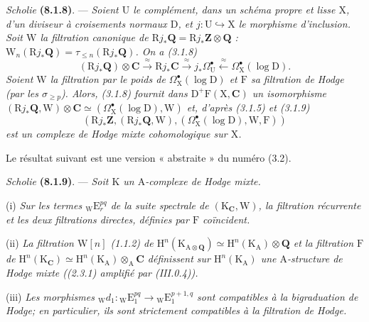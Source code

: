 \documentclass[11pt,leqno]{article}
\begin{document}
\textit{Scholie} \textbf{(8.1.8)}. — \textit{Soient \(\mathrm{U}\) le complément, dans un schéma propre et lisse \(\mathrm{X}\), d’un diviseur à croisements normaux \(\mathrm{D}\), et \(j:\mathrm{U}\hookrightarrow\mathrm{X}\) le morphisme d’inclusion. Soit \(\mathrm{W}\) la filtration canonique de \(\mathrm{R}j_{\ast}\mathbf{Q}=\mathrm{R}j_{\ast}\mathbf{Z}\otimes\mathbf{Q}\) : \(\mathrm{W}_{n}(\mathrm{R}j_{\ast}\mathbf{Q})=\tau_{\leq n}(\mathrm{R}j_{\ast}\mathbf{Q})\). On a (3.1.8)}
\[
(\mathrm{R}j_{\ast}\mathbf{Q})\otimes\mathbf{C}
\xrightarrow{\approx}\mathrm{R}j_{\ast}\mathbf{C}
\xrightarrow{\approx}j_{\ast}\Omega_{\mathrm{U}}^\bullet
\xleftarrow{\approx}\Omega_{\mathrm{X}}^\bullet(\log\mathrm{D}).
\]
\textit{Soient \(\mathrm{W}\) la filtration par le poids de \(\Omega_{\mathrm{X}}^\bullet(\log\mathrm{D})\) et \(\mathrm{F}\) sa filtration de Hodge (par les \(\sigma_{\geq p}\)). Alors, (3.1.8) fournit dans \(\mathrm{D}^{+}\mathrm{F}(\mathrm{X},\mathbf{C})\) un isomorphisme \((\mathrm{R}j_{\ast}\mathbf{Q},\mathrm{W})\otimes\mathbf{C}\simeq(\Omega_{\mathrm{X}}^\bullet(\log\mathrm{D}),\mathrm{W})\) et, d’après (3.1.5) et (3.1.9)}
\[
(\mathrm{R}j_{\ast}\mathbf{Z},(\mathrm{R}j_{\ast}\mathbf{Q},\mathrm{W}),
(\Omega_{\mathrm{X}}^\bullet(\log\mathrm{D}),\mathrm{W},\mathrm{F}))
\]
\textit{est un complexe de Hodge mixte cohomologique sur \(\mathrm{X}\).}

Le résultat suivant est une version « abstraite » du numéro (3.2).

\textit{Scholie} \textbf{(8.1.9)}. — \textit{Soit \(\mathrm{K}\) un \(\mathrm{A}\)-complexe de Hodge mixte.}

(i) \textit{Sur les termes \({}_{\mathrm{W}}\mathrm{E}_{r}^{pq}\) de la suite spectrale de \((\mathrm{K}_{\mathbf{C}},\mathrm{W})\), la filtration récurrente et les deux filtrations directes, définies par \(\mathrm{F}\) coïncident.}

(ii) \textit{La filtration \(\mathrm{W}[n]\) (1.1.2) de \(\mathrm{H}^{n}(\mathrm{K}_{\mathrm{A}\otimes\mathbf{Q}})\simeq\mathrm{H}^{n}(\mathrm{K}_{\mathrm{A}})\otimes\mathbf{Q}\) et la filtration \(\mathrm{F}\) de \(\mathrm{H}^{n}(\mathrm{K}_{\mathbf{C}})\simeq\mathrm{H}^{n}(\mathrm{K}_{\mathrm{A}})\otimes_{\mathrm{A}}\mathbf{C}\) définissent sur \(\mathrm{H}^{n}(\mathrm{K}_{\mathrm{A}})\) une \(\mathrm{A}\)-structure de Hodge mixte ((2.3.1) amplifié par (III.0.4)).}

(iii) \textit{Les morphismes \({}_{\mathrm{W}}d_{1}:{}_{\mathrm{W}}\mathrm{E}_{1}^{pq}\to{}_{\mathrm{W}}\mathrm{E}_{1}^{p+1,q}\) sont compatibles à la bigraduation de Hodge; en particulier, ils sont strictement compatibles à la filtration de Hodge.}
\end{document}
